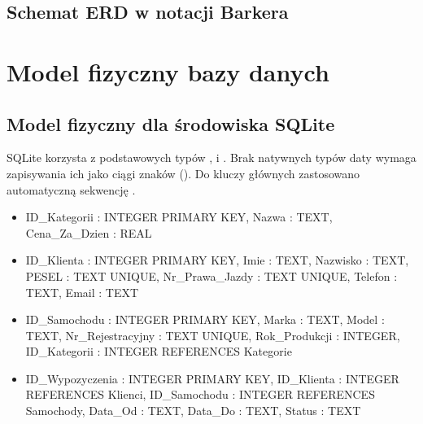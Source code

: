 \documentclass[a4paper,11pt,english,openany,oneside]{sphinxmanual}
\begin{document}
\subsection{Schemat ERD w notacji Barkera}
\label{\detokenize{rozdzial_3/index:schemat-erd-w-notacji-barkera}}

\section{Model fizyczny bazy danych}
\label{\detokenize{rozdzial_3/index:model-fizyczny-bazy-danych}}

\subsection{Model fizyczny dla środowiska SQLite}
\label{\detokenize{rozdzial_3/index:model-fizyczny-dla-srodowiska-sqlite}}
\sphinxAtStartPar
SQLite korzysta z podstawowych typów ,  i . Brak natywnych typów daty wymaga zapisywania ich jako ciągi znaków (). Do kluczy głównych zastosowano automatyczną sekwencję .
\begin{itemize}
\item {} 
\sphinxAtStartPar
{} ID\_Kategorii : INTEGER PRIMARY KEY, Nazwa : TEXT, Cena\_Za\_Dzien : REAL

\item {} 
\sphinxAtStartPar
{} ID\_Klienta : INTEGER PRIMARY KEY, Imie : TEXT, Nazwisko : TEXT, PESEL : TEXT UNIQUE, Nr\_Prawa\_Jazdy : TEXT UNIQUE, Telefon : TEXT, Email : TEXT

\item {} 
\sphinxAtStartPar
{} ID\_Samochodu : INTEGER PRIMARY KEY, Marka : TEXT, Model : TEXT, Nr\_Rejestracyjny : TEXT UNIQUE, Rok\_Produkcji : INTEGER, ID\_Kategorii : INTEGER REFERENCES Kategorie

\item {} 
\sphinxAtStartPar
{} ID\_Wypozyczenia : INTEGER PRIMARY KEY, ID\_Klienta : INTEGER REFERENCES Klienci, ID\_Samochodu : INTEGER REFERENCES Samochody, Data\_Od : TEXT, Data\_Do : TEXT, Status : TEXT

\end{itemize}
\end{document}
